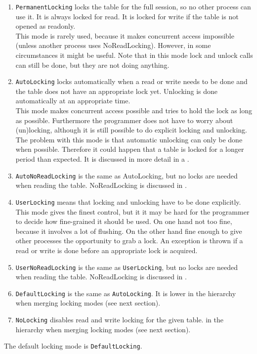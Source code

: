 \begin{enumerate}
\item \texttt{PermanentLocking} locks the table for
the full session, so no other process can use it. It is always
locked for read. It is locked for write if the table is not opened
as readonly.
\\This mode is rarely used, because it makes concurrent access
impossible (unless another process uses NoReadLocking).
However, in some circumstances it might
be useful. Note that in this mode lock and unlock calls can still be
done, but they are not doing anything.
\item \texttt{AutoLocking} locks automatically when a read or write needs
to be done and the table does not have an appropriate lock yet.
Unlocking is done automatically at an appropriate time.
\\This mode makes concurrent access possible and tries to hold the lock as
long as possible. Furthermore the programmer
does not have to worry about (un)locking, although it is still possible to
do explicit locking and unlocking.
\\The problem with this mode is that automatic unlocking can only
be done when possible. Therefore it
could happen that a table is locked for a longer period than expected.
It is discussed in more detail in a
.
\item \texttt{AutoNoReadLocking} is the same as AutoLocking, but no
locks are needed when reading the table. NoReadLocking is discussed in
.
\item \texttt{UserLocking} means that locking and unlocking have
to be done explicitly.
\\This mode gives the finest control, but it it may be hard for the
programmer to decide how fine-grained it should be used. On one hand
not too fine, because it involves a lot of flushing. On the other hand
fine enough to give other processes the opportunity to grab a lock.
An exception is thrown if a
read or write is done before an appropriate lock is acquired.
\item \texttt{UserNoReadLocking} is the same as \texttt{UserLocking}, but no
locks are needed when reading the table. NoReadLocking is discussed in
.
\item \texttt{DefaultLocking} is the same as \texttt{AutoLocking}. It is lower
in the hierarchy when merging locking modes (see next section).
\item \texttt{NoLocking} disables read and write locking for the given table.
in the hierarchy when merging locking modes (see next section).
\end{enumerate}
The default locking mode is \texttt{DefaultLocking}.

